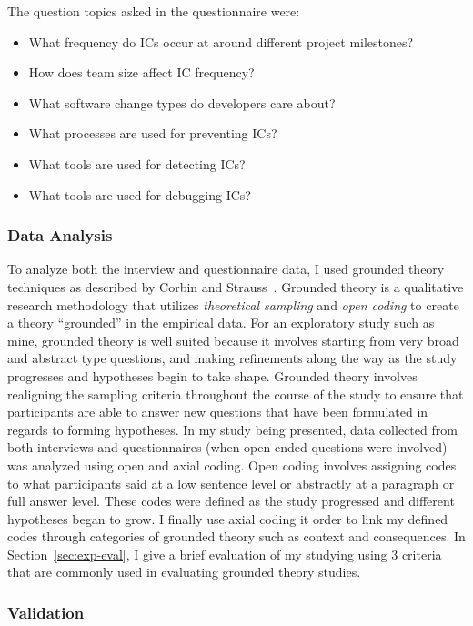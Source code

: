 The question topics asked in the questionnaire were:

\begin{itemize}
\item What frequency do ICs occur at around different project milestones?
\item How does team size affect IC frequency?
\item What software change types do developers care about?
\item What processes are used for preventing ICs?
\item What tools are used for detecting ICs?
\item What tools are used for debugging ICs?
\end{itemize}


\subsubsection{Data Analysis}
To analyze both the interview and questionnaire data, I used grounded theory techniques as described by Corbin and Strauss~\cite{Corbin:1998:SP}.
Grounded theory is a qualitative research methodology that utilizes \textit{theoretical sampling} and
\textit{open coding} to create a theory ``grounded'' in the empirical data. For an exploratory study such as
mine, grounded theory is well suited because it involves starting from very broad and abstract type questions, and
making refinements along the way as the study progresses and hypotheses begin to take shape. Grounded theory involves
realigning the sampling criteria throughout the course of the study to ensure that participants are able to answer new
questions that have been formulated in regards to forming hypotheses. In my study being presented, data collected from
both interviews and questionnaires (when open ended questions were involved) was analyzed using open and axial coding. Open coding involves
assigning codes to what participants said at a low sentence level or abstractly at a paragraph or full answer level. These
codes were defined as the study progressed and different hypotheses began to grow. I finally use axial coding it order to
link my defined codes through categories of grounded theory such as context and consequences. 
In Section~\ref{sec:exp-eval}, I give a brief evaluation of my studying using 
3 criteria that are commonly used in evaluating grounded theory studies.

\subsubsection{Validation}

